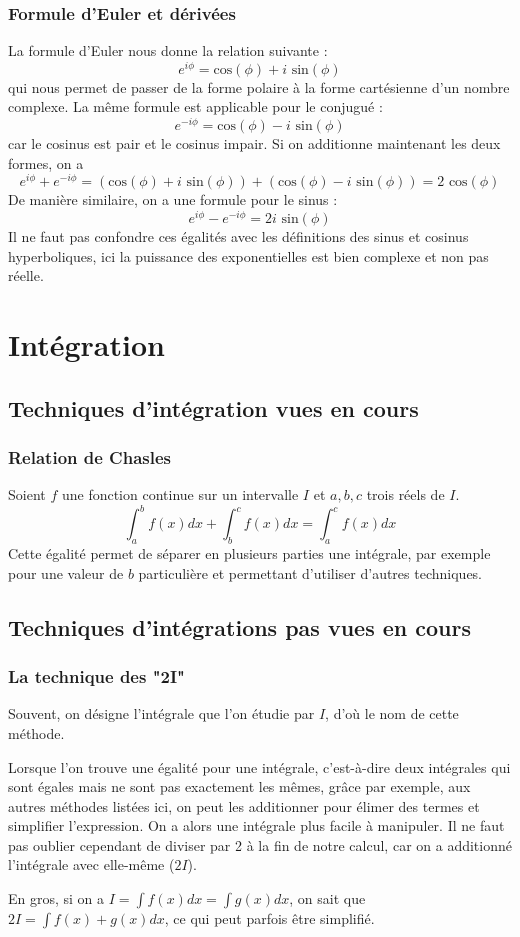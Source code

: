 \documentclass[10pt,a4paper]{book}
\begin{document}
\subsection{Formule d'Euler et dérivées}
La formule d'Euler nous donne la relation suivante :
\[e^{i\phi} = \text{cos}(\phi)+i\text{ sin}(\phi)\]
qui nous permet de passer de la forme polaire à la forme cartésienne d'un nombre complexe. La même formule est applicable pour le conjugué :
\[e^{-i\phi} = \text{cos}(\phi)-i\text{ sin}(\phi)\]
car le cosinus est pair et le cosinus impair. Si on additionne maintenant les deux formes, on a
\[e^{i\phi}+e^{-i\phi} = (\text{cos}(\phi) + i\text{ sin}(\phi)) + (\text{cos}(\phi) - i\text{ sin}(\phi)) = 2\text{ cos}(\phi)\]
De manière similaire, on a une formule pour le sinus :
\[e^{i\phi}-e^{-i\phi} = 2i\text{ sin}(\phi)\]
Il ne faut pas confondre ces égalités avec les définitions des sinus et cosinus hyperboliques, ici la puissance des exponentielles est bien complexe et non pas réelle.

\chapter{Intégration}
\section{Techniques d'intégration vues en cours}
\subsection{Relation de Chasles}
Soient $f$ une fonction continue sur un intervalle $I$ et $a,b,c$ trois réels de $I$.
\[\int^b_af(x)dx + \int^c_bf(x)dx = \int^c_af(x)dx\]
Cette égalité permet de séparer en plusieurs parties une intégrale, par exemple pour une valeur de $b$ particulière et permettant d'utiliser d'autres techniques.

\section{Techniques d'intégrations pas vues en cours}
\subsection{La technique des "2I"}
Souvent, on désigne l'intégrale que l'on étudie par $I$, d'où le nom de cette méthode.\par 
Lorsque l'on trouve une égalité pour une intégrale, c'est-à-dire deux inté\-grales qui sont égales mais ne sont pas exactement les mêmes, grâce par exemple, aux autres méthodes listées ici, on peut les additionner pour élimer des termes et simplifier l'expression. On a alors une intégrale plus facile à manipuler. Il ne faut pas oublier cependant de diviser par 2 à la fin de notre calcul, car on a additionné l'intégrale avec elle-même ($2I$).\par 
En gros, si on a $I=\int f(x)dx = \int g(x)dx$, on sait que $2I = \int f(x)+g(x)dx$, ce qui peut parfois être simplifié.
\end{document}
